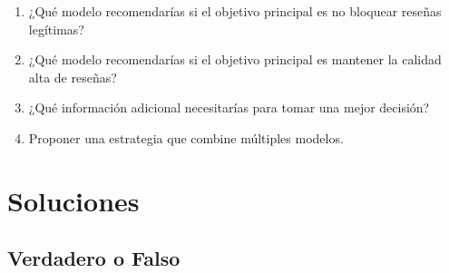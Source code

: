 \documentclass[12pt]{article}
\begin{document}
\begin{enumerate}
    \item[a.] ¿Qué modelo recomendarías si el objetivo principal es no bloquear reseñas legítimas?
    \item[b.] ¿Qué modelo recomendarías si el objetivo principal es mantener la calidad alta de reseñas?
    \item[c.] ¿Qué información adicional necesitarías para tomar una mejor decisión?
    \item[d.] Proponer una estrategia que combine múltiples modelos.
\end{enumerate}

\newpage

\section{Soluciones}

\subsection{Verdadero o Falso}
\end{document}

